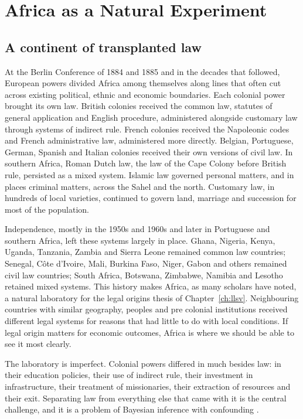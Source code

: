 \chapter{Africa as a Natural Experiment}
\label{ch:africa}

\section{A continent of transplanted law}

At the Berlin Conference of 1884 and 1885 and in the decades that followed, European powers divided Africa among themselves along lines that often cut across existing political, ethnic and economic boundaries. Each colonial power brought its own law. British colonies received the common law, statutes of general application and English procedure, administered alongside customary law through systems of indirect rule. French colonies received the Napoleonic codes and French administrative law, administered more directly. Belgian, Portuguese, German, Spanish and Italian colonies received their own versions of civil law. In southern Africa, Roman Dutch law, the law of the Cape Colony before British rule, persisted as a mixed system. Islamic law governed personal matters, and in places criminal matters, across the Sahel and the north. Customary law, in hundreds of local varieties, continued to govern land, marriage and succession for most of the population.

Independence, mostly in the 1950s and 1960s and later in Portuguese and southern Africa, left these systems largely in place. Ghana, Nigeria, Kenya, Uganda, Tanzania, Zambia and Sierra Leone remained common law countries; Senegal, C\^ote d'Ivoire, Mali, Burkina Faso, Niger, Gabon and others remained civil law countries; South Africa, Botswana, Zimbabwe, Namibia and Lesotho retained mixed systems. This history makes Africa, as many scholars have noted, a natural laboratory for the legal origins thesis of Chapter~\ref{ch:llsv}. Neighbouring countries with similar geography, peoples and pre colonial institutions received different legal systems for reasons that had little to do with local conditions. If legal origin matters for economic outcomes, Africa is where we should be able to see it most clearly.

The laboratory is imperfect. Colonial powers differed in much besides law: in their education policies, their use of indirect rule, their investment in infrastructure, their treatment of missionaries, their extraction of resources and their exit. Separating law from everything else that came with it is the central challenge, and it is a problem of Bayesian inference with confounding \citep{klerman2011}.

